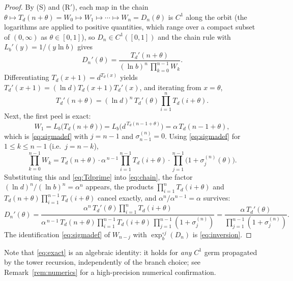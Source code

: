 \documentclass[11pt]{article}
\theoremstyle{definition}
\theoremstyle{remark}
\newcommand{\Lb}{L_{b}}
\newcommand{\Td}{T_{d}}
\newcommand{\expb}{\exp_{b}}
\begin{document}
\begin{proof}
By (S) and (R$'$), each map in the chain
$\theta\mapsto\Td(n+\theta)=W_0\mapsto W_1\mapsto\cdots\mapsto W_n=D_n(\theta)$
is $C^{1}$ along the orbit (the logarithms are applied to positive
quantities, which range over a compact subset of $(0,\infty)$ as
$\theta\in[0,1]$), so $D_n\in C^{1}([0,1])$ and the chain rule with
$\Lb'(y)=1/(y\ln b)$ gives
\begin{equation}\label{eq:chain}
D_n'(\theta)=\frac{\Td'(n+\theta)}{(\ln b)^{n}\,\prod_{k=0}^{n-1}W_k}.
\end{equation}
Differentiating $\Td(x+1)=d^{\Td(x)}$ yields
$\Td'(x+1)=(\ln d)\Td(x+1)\Td'(x)$, and iterating from $x=\theta$,
\begin{equation}\label{eq:Tdprime}
\Td'(n+\theta)=(\ln d)^{n}\,\Td'(\theta)\prod_{i=1}^{n}\Td(i+\theta).
\end{equation}
Next, the first peel is exact:
\[
W_1=\Lb\big(\Td(n+\theta)\big)=\Lb\big(d^{\,\Td(n-1+\theta)}\big)
=\alpha\,\Td(n-1+\theta),
\]
which is \eqref{eq:sigmadef} with $j=n-1$ and $\sigma_{n-1}^{(n)}=0$.
Using \eqref{eq:sigmadef} for $1\le k\le n-1$ (i.e.\ $j=n-k$),
\[
\prod_{k=0}^{n-1}W_k
=\Td(n+\theta)\cdot\alpha^{\,n-1}\prod_{i=1}^{n-1}\Td(i+\theta)
\cdot\prod_{j=1}^{n-1}\big(1+\sigma_j^{(n)}(\theta)\big).
\]
Substituting this and \eqref{eq:Tdprime} into \eqref{eq:chain}, the factor
$(\ln d)^{n}/(\ln b)^{n}=\alpha^{n}$ appears, the products
$\prod_{i=1}^{n}\Td(i+\theta)$ and
$\Td(n+\theta)\prod_{i=1}^{n-1}\Td(i+\theta)$ cancel exactly, and
$\alpha^{n}/\alpha^{n-1}=\alpha$ survives:
\[
D_n'(\theta)
=\frac{\alpha^{n}\,\Td'(\theta)\prod_{i=1}^{n}\Td(i+\theta)}
{\alpha^{\,n-1}\,\Td(n+\theta)\prod_{i=1}^{n-1}\Td(i+\theta)\,
\prod_{j=1}^{n-1}(1+\sigma_j^{(n)})}
=\frac{\alpha\,\Td'(\theta)}{\prod_{j=1}^{n-1}(1+\sigma_j^{(n)})}.
\]
The identification \eqref{eq:sigmadef} of $W_{n-j}$ with
$\expb^{\circ j}(D_n)$ is \eqref{eq:inversion}.
\end{proof}

Note that \eqref{eq:exact} is an algebraic identity: it holds for
\emph{any} $C^{1}$ germ propagated by the tower recursion, independently
of the branch choice; see Remark~\ref{rem:numerics} for a high-precision
numerical confirmation.
\end{document}
